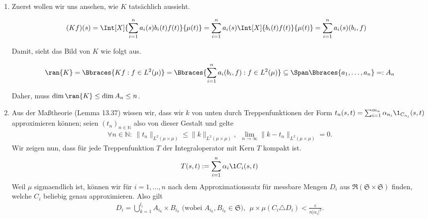 \begin{solution}

\phantom{}

\begin{enumerate}[label = (\alph*)]

  \item
  Zuerst wollen wir uns ansehen, wie $K$ tatsächlich aussieht.

  \begin{align*}
    (K f)(s)
    & =
    \Int[X]
    {
      \sum_{i=1}^n
      a_i(s) b_i(t) f(t)
    }{\mu(t)}
    =
    \sum_{i=1}^n
    a_i(s) \Int[X]{b_i(t) f(t)}{\mu(t)}
    =
    \sum_{i=1}^n
    a_i(s) (b_i, f)
  \end{align*}

  Damit, sieht das Bild von $K$ wie folgt aus.

  \begin{align*}
    \ran{K}
    =
    \Bbraces
    {
      K f:
      f \in L^2(\mu)
    }
    =
    \Bbraces
    {
      \sum_{i=1}^n
      a_i (b_i, f):
      f \in L^2(\mu)
    }
    \subseteq
    \Span \Bbraces{a_1, \ldots, a_n}
    =: A_n
  \end{align*}

  Daher, muss $\dim \ran{K} \leq \dim{A_n} \leq n$.

  \item
Aus der Maßtheorie (Lemma 13.37) wissen wir, dass wir $k$ von unten durch Treppenfunktionen der Form $t_n(s,t) = \sum_{i=1}^{m_n} \alpha_{n_i} \1_{C_{n_i}}(s,t)$ approximieren können; seien $(t_n)_{n \in \mathbb{N}}$ also von dieser Gestalt und gelte
\begin{align*}
    \forall n \in \mathbb{N}:~ \|t_n\|_{L^2(\mu\times\mu)} \leq \|k\|_{L^2(\mu\times\mu)}, ~~\lim\limits_{n \rightarrow \infty}{\|k-t_n\|_{L^2(\mu\times\mu)}} = 0.
\end{align*}
Wir zeigen nun, dass für jede Treppenfunktion $T$ der Integraloperator mit Kern $T$ kompakt ist.
\begin{align*}
  T(s,t) := \sum_{i = 1}^n \alpha_i \1C_i(s,t)
\end{align*}
Weil $\mu$ sigmaendlich ist, können wir für $i = 1,\dots,n$ nach dem Approximationssatz für messbare Mengen
$D_i$ aus $\mathfrak{R}(\mathfrak{S} \times \mathfrak{S})$ finden, welche $C_i$ beliebig genau
approximieren. Also gilt
\begin{align*}
    D_i = \bigcup_{k=1}^{l_i} A_{i_k} \times B_{i_k} \text{~(wobei~} A_{i_k}, B_{i_k} \in \mathfrak{S}), ~~\mu\times\mu(C_i \triangle D_i) < \frac{\epsilon}{n|\alpha_i|^2}.
\end{align*}


\end{enumerate}
\end{solution}
